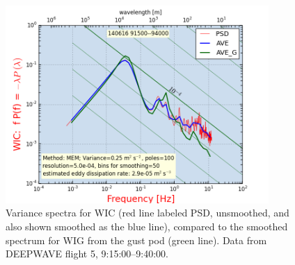 \documentclass[12pt,twoside,english]{article}\usepackage[]{graphicx}\usepackage[]{color}
\let\OrgIndex\index
\renewcommand*{\index}[1]{\OrgIndex{#1}}
\begin{document}
{%
% 
% 
% 

\begin{figure}
\noindent \begin{centering}
\includegraphics[width=10cm]{SpecialGraphics/GPrf11Fig5.png}  
\par\end{centering}

\protect\caption{\label{fig:VarSpecWICandWIG}Variance spectra for WIC (red line labeled PSD, unsmoothed, and also shown smoothed as the blue line), compared to the smoothed spectrum for WIG from the gust pod (green line). Data from DEEPWAVE flight 5, 9:15:00--9:40:00.} 
\end{figure}
}
\end{document}
